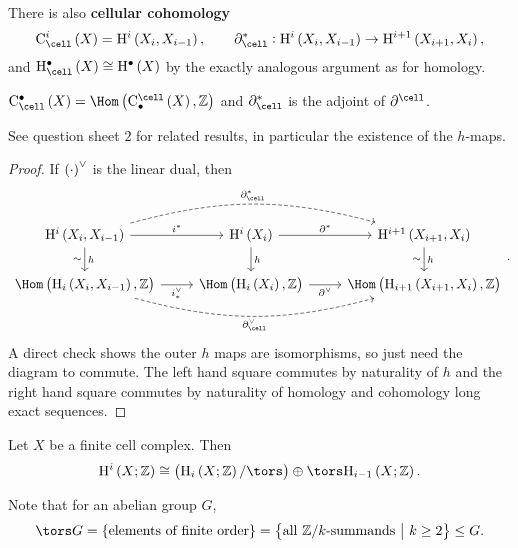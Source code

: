 
There is also \textbf{cellular cohomology}
$$ \C_{\cell}^i\br{X} = \H^i\br{X_i, X_{i - 1}}, \qquad \da_{\cell}^* : \H^i\br{X_i, X_{i - 1}} \to \H^{i + 1}\br{X_{i + 1}, X_i}, $$
and $ \H_{\cell}^\bullet\br{X} \cong \H^\bullet\br{X} $ by the exactly analogous argument as for homology.

\pagebreak

\begin{lemma}
$ \C_{\cell}^\bullet\br{X} = \Hom\br{\C_\bullet^{\cell}\br{X}, \ZZ} $ and $ \da_{\cell}^* $ is the adjoint of $ \da^{\cell} $.
\end{lemma}

See question sheet $ 2 $ for related results, in particular the existence of the $ h $-maps.

\begin{proof}
If $ \br{\cdot}^\vee $ is the linear dual, then
$$
\begin{tikzcd}
\H^i\br{X_i, X_{i - 1}} \arrow{r}{i^*} \arrow[bend left=15, dashed]{rr}{\da_{\cell}^*} \arrow{d}{h}[swap]{\sim} & \H^i\br{X_i} \arrow{r}{\da^*} \arrow{d}{h} & \H^{i + 1}\br{X_{i + 1}, X_i} \arrow{d}{h}[swap]{\sim} \\
\Hom\br{\H_i\br{X_i, X_{i - 1}}, \ZZ} \arrow{r}[swap]{i_*^\vee} \arrow[bend right=15, dashed]{rr}[swap]{\da_{\cell}^\vee} & \Hom\br{\H_i\br{X_i}, \ZZ} \arrow{r}[swap]{\da^\vee} & \Hom\br{\H_{i + 1}\br{X_{i + 1}, X_i}, \ZZ}
\end{tikzcd}.
$$
A direct check shows the outer $ h $ maps are isomorphisms, so just need the diagram to commute. The left hand square commutes by naturality of $ h $ and the right hand square commutes by naturality of homology and cohomology long exact sequences.
\end{proof}

\begin{proposition}
Let $ X $ be a finite cell complex. Then
$$ \H^i\br{X; \ZZ} \cong \br{\H_i\br{X; \ZZ} / \tors} \oplus \tors \H_{i - 1}\br{X; \ZZ}. $$
\end{proposition}

Note that for an abelian group $ G $,
$$ \tors G = \cbr{\text{elements of finite order}} = \cbr{\text{all $ \ZZ / k $-summands} \st k \ge 2} \le G. $$

